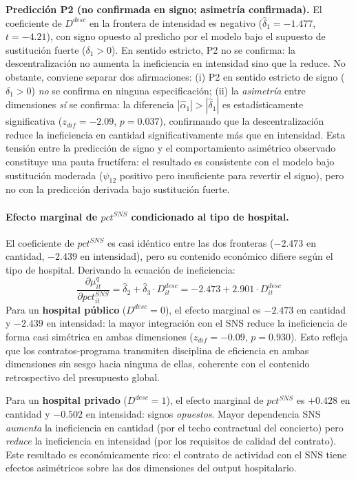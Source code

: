 \documentclass[12pt, a4paper, twoside, openright]{book}
\theoremstyle{plain}
\theoremstyle{definition}
\theoremstyle{remark}
\begin{document}
\textbf{Predicción P2 (no confirmada en signo; asimetría confirmada).} El coeficiente de $D^{desc}$ en la frontera de intensidad es negativo ($\hat{\delta}_1 = -1.477$, $t=-4.21$), con signo opuesto al predicho por el modelo bajo el supuesto de sustitución fuerte ($\delta_1 > 0$). En sentido estricto, P2 no se confirma: la descentralización no aumenta la ineficiencia en intensidad sino que la reduce. No obstante, conviene separar dos afirmaciones: (i) P2 en sentido estricto de signo ($\delta_1 > 0$) \textit{no} se confirma en ninguna especificación; (ii) la \textit{asimetría} entre dimensiones \textit{sí} se confirma: la diferencia $|\hat{\alpha}_1| > |\hat{\delta}_1|$ es estadísticamente significativa ($z_{dif}=-2.09$, $p=0.037$), confirmando que la descentralización reduce la ineficiencia en cantidad significativamente más que en intensidad. Esta tensión entre la predicción de signo y el comportamiento asimétrico observado constituye una pauta fructífera: el resultado es consistente con el modelo bajo sustitución moderada ($\psi_{12}$ positivo pero insuficiente para revertir el signo), pero no con la predicción derivada bajo sustitución fuerte.

\paragraph{Efecto marginal de $pct^{SNS}$ condicionado al tipo de hospital.}
El coeficiente de $pct^{SNS}$ es casi idéntico entre las dos fronteras ($-2.473$ en cantidad, $-2.439$ en intensidad), pero su contenido económico difiere según el tipo de hospital. Derivando la ecuación de ineficiencia:
\begin{equation}
  \frac{\partial \mu^q_{it}}{\partial pct^{SNS}_{it}} =
  \hat{\delta}_2 + \hat{\delta}_3 \cdot D^{desc}_{it} =
  -2.473 + 2.901 \cdot D^{desc}_{it}
  \label{eq:dpct_dq}
\end{equation}
Para un \textbf{hospital público} ($D^{desc}=0$), el efecto marginal es $-2.473$ en cantidad y $-2.439$ en intensidad: la mayor integración con el SNS reduce la ineficiencia de forma casi simétrica en ambas dimensiones ($z_{dif}=-0.09$, $p=0.930$). Esto refleja que los contratos-programa transmiten disciplina de eficiencia en ambas dimensiones sin sesgo hacia ninguna de ellas, coherente con el contenido retrospectivo del presupuesto global.

Para un \textbf{hospital privado} ($D^{desc}=1$), el efecto marginal de $pct^{SNS}$ es $+0.428$ en cantidad y $-0.502$ en intensidad: signos \textit{opuestos}. Mayor dependencia SNS \textit{aumenta} la ineficiencia en cantidad (por el techo contractual del concierto) pero \textit{reduce} la ineficiencia en intensidad (por los requisitos de calidad del contrato). Este resultado es económicamente rico: el contrato de actividad con el SNS tiene efectos asimétricos sobre las dos dimensiones del output hospitalario.
\end{document}
